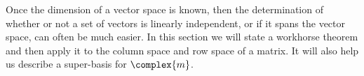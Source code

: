 %
\begin{introduction}
\begin{para}Once the dimension of a vector space is known, then the determination of whether or not a set of vectors is linearly independent, or if it spans the vector space, can often be much easier.  In this section we will state a workhorse theorem and then apply it to the column space and row space of a matrix.  It will also help us describe a super-basis for $\complex{m}$.\end{para}
\end{introduction}
%

